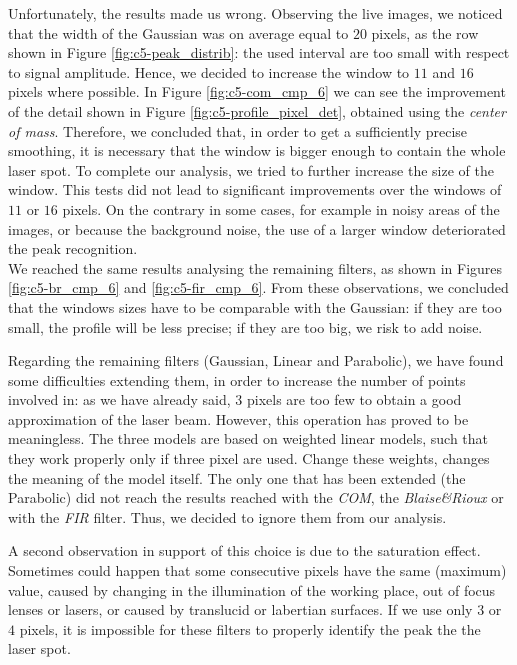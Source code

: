 Unfortunately, the results made us wrong. Observing the live images, we noticed that the width of the Gaussian was on average equal to $20$ pixels, as the row shown in Figure \ref{fig:c5-peak_distrib}: the used interval are too small with respect to signal amplitude. Hence, we decided to increase the window to $11$ and $16$ pixels where possible. In Figure \ref{fig:c5-com_cmp_6} we can see the improvement of the detail shown in Figure \ref{fig:c5-profile_pixel_det}, obtained using the \textit{center of mass}. Therefore, we concluded that, in order to get a sufficiently precise smoothing, it is necessary that the window is bigger enough to contain the whole laser spot. To complete our analysis, we tried to further increase the size of the window. This tests did not lead to significant improvements over the windows of $11$ or $16$ pixels. On the contrary in some cases, for example in noisy areas of the images, or because the background noise, the use of a larger window deteriorated the peak recognition. \\
We reached the same results analysing the remaining filters, as shown in Figures \ref{fig:c5-br_cmp_6} and \ref{fig:c5-fir_cmp_6}. From these observations, we concluded that the windows sizes have to be comparable with the Gaussian: if they are too small, the profile will be less precise; if they are too big, we risk to add noise.

Regarding the remaining filters (Gaussian, Linear and Parabolic), we have found some difficulties extending them, in order to increase the number of points involved in: as we have already said, $3$ pixels are too few to obtain a good approximation of the laser beam. However, this operation has proved to be meaningless. The three models are based on weighted linear models, such that they work properly only if three pixel are used. Change these weights, changes the meaning of the model itself. The only one that has been extended (the Parabolic) did not reach the results reached with the \textit{\acs{COM}}, the \textit{Blaise\&Rioux} or with the \textit{FIR} filter. Thus, we decided to ignore them from our analysis.

A second observation in support of this choice is due to the saturation effect. Sometimes could happen that some consecutive pixels have the same (maximum) value, caused by changing in the illumination of the working place, out of focus lenses or lasers, or caused by translucid or labertian surfaces. If we use only $3$ or $4$ pixels, it is impossible for these filters to properly identify the peak the the laser spot. \\
  
